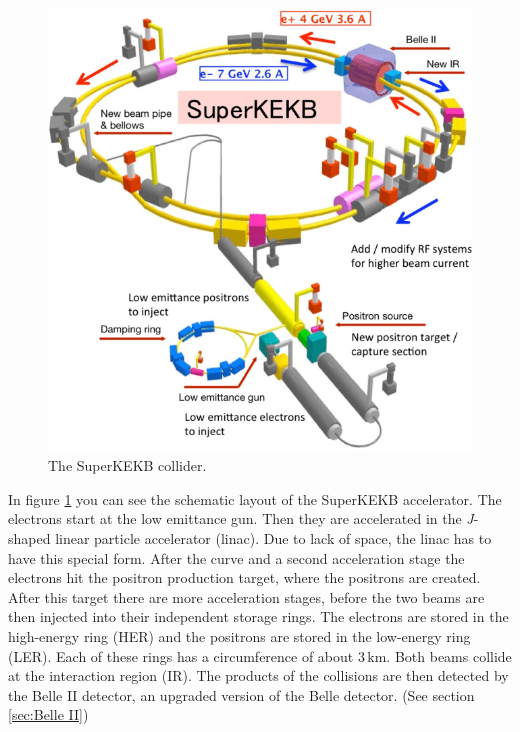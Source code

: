 \documentclass[a4paper,11pt,twosided,final,german,openbib,pdftex,listof=totoc,bibliography=totoc]{scrbook}
\begin{document}
\begin{figure}[h!]
\begin{center}
	\includegraphics[width=\textwidth]{Bilder/SuperKEKB.png}
	
	\caption[SuperKEKB Collider]{The SuperKEKB collider.\cite{SKEKAcc}}
	\label{fig:SuperKEKB}
\end{center}
\end{figure}






In figure \ref{fig:SuperKEKB} you can see the schematic layout of the SuperKEKB accelerator. The electrons start at the low emittance gun. Then they are accelerated in the \textit{J}-shaped linear particle accelerator (linac). Due to lack of space, the linac has to have this special form.\cite{KEKBJArc} After the curve and a second acceleration stage the electrons hit the positron production target, where the positrons are created. After this target there are more acceleration stages, before the two beams are then injected into their independent storage rings. The electrons are stored in the high-energy ring (HER) and the positrons are stored in the low-energy ring (LER). Each of these rings has a circumference of about $3\,\textrm{km}$. Both beams collide at the interaction region (IR). The products of the collisions are then detected by the Belle II detector, an upgraded version of the Belle detector.\cite{B2B} (See section \ref{sec:Belle II})
\end{document}
